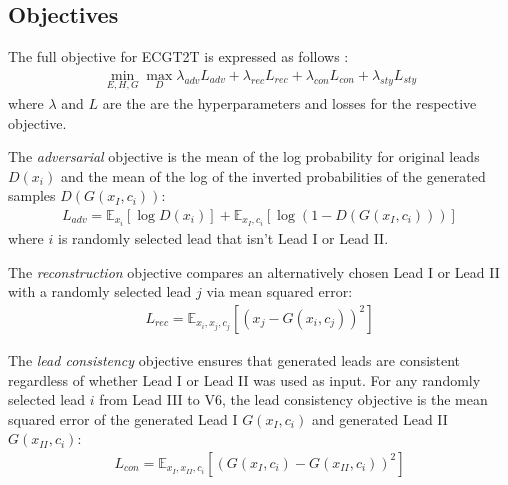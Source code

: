 % 









\subsection{Objectives}

The full objective for ECGT2T is expressed as follows :
\begin{align*}
    \min_{E,H,G} \max_{D} \lambda_{adv} L_{adv} + \lambda_{rec} L_{rec}
    + \lambda_{con} L_{con} + \lambda_{sty} L_{sty} 
\end{align*}
where $\lambda$ and $L$ are the are the hyperparameters and losses for the respective objective.


The \textit{adversarial} objective is the mean of the log probability for original leads $D(x_{i})$ and the mean of the log of the inverted probabilities of the generated samples $D(G(x_{I},c_{i}))$:
\begin{align*}
    L_{adv} = \mathbb{E}_{x_{i}}[\log{D(x_{i})}] + \mathbb{E}_{x_{I},c_{i}}[\log{(1-D(G(x_{I},c_{i})))}]
\end{align*}
where $i$ is randomly selected lead that isn't Lead I or Lead II.

The \textit{reconstruction} objective compares an alternatively chosen Lead I or Lead II with a randomly selected lead $j$ via mean squared error:
\begin{align*}
    L_{rec} = \mathbb{E}_{x_{i},x_{j},c_{j}}[(x_{j} - G(x_{i},c_{j}))^2]
\end{align*}

The \textit{lead consistency} objective ensures that generated leads are consistent regardless of whether Lead I or Lead II was used as input.  For any randomly selected lead $i$ from Lead III to V6, the lead consistency objective is the mean squared error of the generated Lead I $G(x_{I},c_{i})$ and generated Lead II $G(x_{II},c_{i})$:
\begin{align*}
    L_{con} = \mathbb{E}_{x_{I},x_{II},c_{i}}[(G(x_{I},c_{i}) - G(x_{II},c_{i}))^2]
\end{align*}

